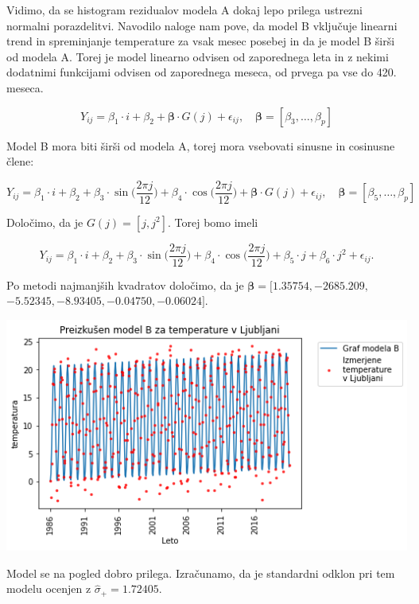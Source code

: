 \documentclass[12pt, a4paper]{article}
\begin{document}
Vidimo, da se histogram rezidualov modela A dokaj lepo prilega ustrezni 
normalni porazdelitvi.
Navodilo naloge nam pove, da model B vključuje linearni trend in spreminjanje 
temperature za vsak mesec posebej in da je model B širši od modela A. Torej je 
model linearno odvisen od zaporednega leta in z nekimi dodatnimi funkcijami 
odvisen od zaporednega meseca, od prvega pa vse do 420. meseca. 

$$ Y_{ij} = \beta_1 \cdot i + \beta_2 + \boldsymbol{\beta} \cdot G(j) + 
\epsilon_{ij}, \quad \boldsymbol{\beta} = [\beta_3, \ldots, \beta_p]
$$

Model B mora biti širši od modela A, torej mora vsebovati sinusne in cosinusne 
člene:

$$ Y_{ij} = \beta_1 \cdot i + \beta_2 + \beta_3 \cdot \sin \Big(\frac{2\pi j}{12}\Big)
+ \beta_4 \cdot \cos \Big(\frac{2\pi j}{12}\Big) + \boldsymbol{\beta} \cdot G(j) + 
\epsilon_{ij}, \quad \boldsymbol{\beta} = [\beta_5, \ldots, \beta_p]
$$

Določimo, da je $G(j) = [j, j^2]$. Torej bomo imeli

$$ Y_{ij} = \beta_1 \cdot i + \beta_2 + \beta_3 \cdot \sin \Big(\frac{2\pi j}{12}\Big)
+ \beta_4 \cdot \cos \Big(\frac{2\pi j}{12}\Big) + \beta_5 \cdot j + \beta_6 \cdot j^2 
+ \epsilon_{ij} \text{.}
$$

Po metodi najmanjših kvadratov določimo, da je $\boldsymbol{\beta} = [1.35754, 
-2685.209, $ $-5.52345, -8.93405, -0.04750, -0.06024]$. 

\begin{center}
    \includegraphics[scale=0.7]{Naloga_3_08}
\end{center}

Model se na pogled dobro prilega. Izračunamo, da je standardni odklon pri tem 
modelu ocenjen z $\hat{\sigma}_+ = 1.72405$. 
\end{document}
